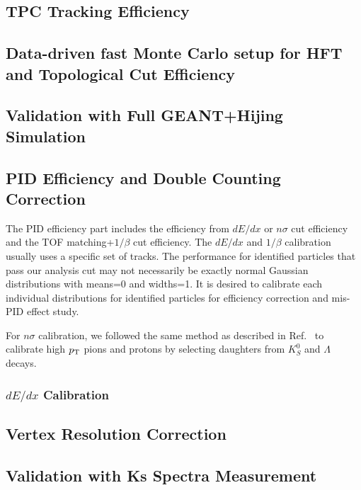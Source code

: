 \documentclass[a4paper]{article}
\begin{document}
\subsection{TPC Tracking Efficiency}

\subsection{Data-driven fast Monte Carlo setup for HFT and Topological Cut Efficiency}

\subsection{Validation with Full GEANT+Hijing Simulation}

\subsection{PID Efficiency and Double Counting Correction}

The PID efficiency part includes the efficiency from $dE/dx$ or $n\sigma$ cut efficiency and the TOF matching+$1/\beta$ cut efficiency. The $dE/dx$ and $1/\beta$ calibration usually uses a specific set of tracks. The performance for identified particles that pass our analysis cut may not necessarily be exactly normal Gaussian distributions with means=0 and widths=1. It is desired to calibrate each individual distributions for identified particles for efficiency correction and mis-PID effect study.

For $n\sigma$ calibration, we followed the same method as described in Ref.~\cite{Xu:2008th} to calibrate high $p_{\rm T}$ pions and protons by selecting daughters from $K_{S}^0$ and $\Lambda$ decays.

\subsubsection{$dE/dx$ Calibration}



\subsection{Vertex Resolution Correction}

\subsection{Validation with Ks Spectra Measurement}
\end{document}
